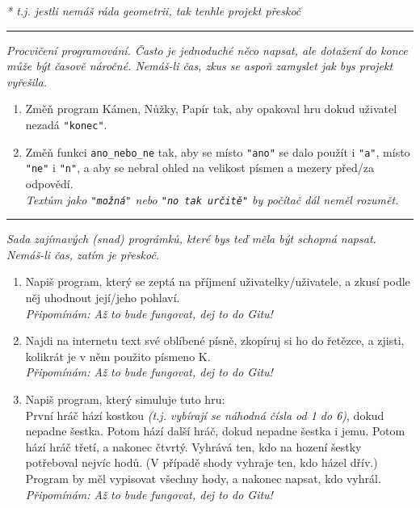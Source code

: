 \documentclass[a4paper,10pt]{article}
\newcommand\startsection[1]{
     \vspace{0.2ex}
    \hrule
    {\fontspec{Oxygen} \tiny
     \vspace{-1ex}
     \emph{#1}
     \vspace{-1.5em}
    }
}
\begin{document}
\begin{enumerate}[resume]
    \emph{\small
        * t.j. jestli nemáš ráda geometrii, tak tenhle projekt přeskoč
    }

\end{enumerate}

\startsection{Procvičení programování. Často je jednoduché něco napsat, ale dotažení do konce může být časově náročné. Nemáš-li čas, zkus se aspoň zamyslet jak bys projekt vyřešila.}

\begin{enumerate}[resume]

\item Změň program Kámen, Nůžky, Papír tak, aby opakoval hru dokud
    uživatel nezadá \texttt{"konec"}.

\item Změň funkci \texttt{ano\_nebo\_ne} tak,
    aby se místo \texttt{"ano"} se dalo použít i \texttt{"a"},
    místo \texttt{"ne"} i \texttt{"n"},
    a aby se nebral ohled na velikost písmen a mezery před/za odpovědí.
    \\\emph{\small
        Textům jako \texttt{"možná"} nebo \texttt{"no tak určitě"}
        by počítač dál neměl rozumět.
    }

\end{enumerate}

\startsection{Sada zajímavých (snad) prográmků, které bys teď měla být schopná napsat. Nemáš-li čas, zatím je přeskoč.}

\begin{enumerate}[resume]

\item Napiš program, který se zeptá na příjmení uživatelky/uživatele,
    a zkusí podle něj uhodnout její/jeho pohlaví.
    \\\emph{\small Připomínám: Až to bude fungovat, dej to do Gitu!}

\item Najdi na internetu text své oblíbené písně, zkopíruj si ho do řetězce,
    a zjisti, kolikrát je v něm použito písmeno K.
    \\\emph{\small Připomínám: Až to bude fungovat, dej to do Gitu!}

\item Napiš program, který simuluje tuto hru:
    \\První hráč hází kostkou
    \emph{(t.j. vybírají se náhodná čísla od 1 do 6)},
    dokud nepadne šestka.
    Potom hází další hráč, dokud nepadne šestka i jemu.
    Potom hází hráč třetí, a nakonec čtvrtý.
    Vyhrává ten, kdo na hození šestky potřeboval nejvíc hodů.
    (V případě shody vyhraje ten, kdo házel dřív.)
    \\Program by měl vypisovat všechny hody, a nakonec napsat, kdo vyhrál.
    \\\emph{\small Připomínám: Až to bude fungovat, dej to do Gitu!}

\end{enumerate}
\end{document}
